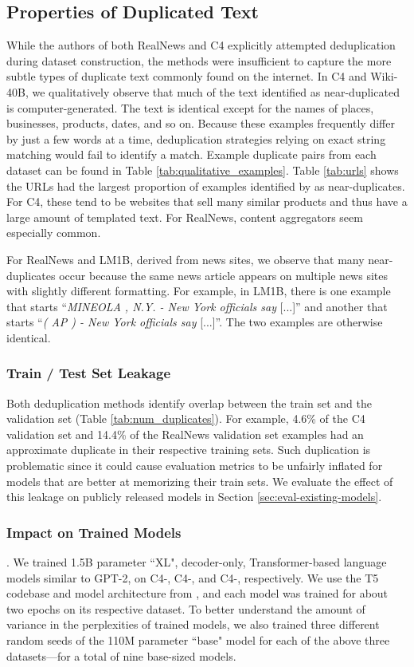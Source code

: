 \subsection{Properties of Duplicated Text}
While the authors of both RealNews and C4 explicitly attempted deduplication during dataset construction, the methods were insufficient to capture the more subtle types of duplicate text commonly found on the internet.
In C4 and Wiki-40B, we qualitatively observe that much of the text identified as near-duplicated is computer-generated.
The text is identical except for the names of places, businesses, products, dates, and so on. 
Because these examples frequently differ by just a few words at a time, deduplication strategies relying on exact string matching would fail to identify a match.
Example duplicate pairs from each dataset can be found in Table \ref{tab:qualitative_examples}.
Table \ref{tab:urls} shows the URLs had the largest proportion of examples identified by \Approx{} as near-duplicates. 
For C4, these tend to be websites that sell many similar products and thus have a large amount of templated text.
For RealNews, content aggregators seem especially common.

For RealNews and LM1B, derived from news sites, we observe that many near-duplicates occur because the same news article appears on multiple news sites with slightly different formatting.
For example, in LM1B, there is one example that starts ``\textit{MINEOLA , N.Y. - New York officials say} [...]'' and another that starts ``\textit{( AP ) - New York officials say} [...]''.
The two examples are otherwise identical.

\subsubsection{Train / Test Set Leakage}
\label{sec:leakage}
Both deduplication methods identify overlap between the train set and the validation set (Table \ref{tab:num_duplicates}).
For example, 4.6\% of the C4 validation set and 14.4\% of the RealNews validation set examples had an approximate duplicate in their respective training sets.
Such duplication is problematic since it could cause evaluation metrics to be unfairly inflated for models that are better at memorizing their train sets.
We evaluate the effect of this leakage on publicly released models in Section \ref{sec:eval-existing-models}.

\subsubsection{Impact on Trained Models}
\label{sec:impact-trained-models}.
We trained 1.5B parameter ``XL", decoder-only, Transformer-based language models similar to GPT-2, on C4-\Original, C4-\Approx, and C4-\Exact, respectively.
We use the T5 codebase and model architecture from \citet{raffel2019exploring}, and each model was trained for about two epochs on its respective dataset.
To better understand the amount of variance in the perplexities of trained models, we also trained three different random seeds of the 110M parameter ``base" model for each of the above three datasets---for a total of nine base-sized models.

